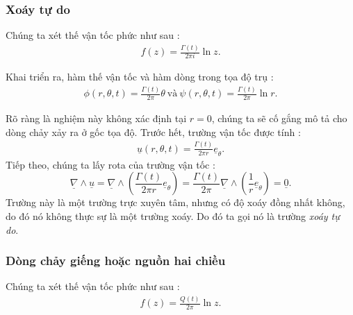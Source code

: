 \documentclass[CO_LUU_CHAT.tex]{subfiles}
\begin{document}
\subsubsection{Xoáy tự do}
Chúng ta xét thế vận tốc phức như sau :
\begin{equation}
	\begin{aligned}
		\boxed{
			f(z)=\frac{\Gamma(t)}{2\pi i}\ln z
		}.
	\end{aligned}
\end{equation}

Khai triển ra, hàm thế vận tốc và hàm dòng trong tọa độ trụ :
\begin{equation}
	\begin{aligned}
		\phi(r,\theta,t)=\frac{\Gamma(t)}{2\pi}\theta\ \text{và}\ \psi(r,\theta,t)=\frac{\Gamma(t)}{2\pi}\ln r.
	\end{aligned}
\end{equation}

Rõ ràng là nghiệm này không xác định tại $r=0$, chúng ta sẽ cố gắng mô tả cho dòng chảy xảy ra ở gốc tọa độ. Trước hết, trường vận tốc được tính :
\begin{equation}
	\begin{aligned}
		\underline{u}(r,\theta,t)=\frac{\Gamma(t)}{2\pi r}\underline{e}_\theta.
	\end{aligned}
\end{equation}
Tiếp theo, chúng ta lấy rota của trường vận tốc :
$$
\underline{\nabla}\wedge\underline{u}=\underline{\nabla}\wedge\left(\frac{\Gamma(t)}{2\pi r}\underline{e}_\theta\right)=\frac{\Gamma(t)}{2\pi}\underline{\nabla}\wedge\left(\frac{1}{r}\underline{e}_\theta\right)=\underline{0}.
$$
Trường này là một trường trực xuyên tâm, nhưng có độ xoáy đồng nhất không, do đó nó không thực sự là một trường xoáy. Do đó ta gọi nó là trường \emph{xoáy tự do}.
\subsubsection{Dòng chảy giếng hoặc nguồn hai chiều}
Chúng ta xét thế vận tốc phức như sau :
\begin{equation}
	\begin{aligned}
		\boxed{
			f(z)=\frac{Q(t)}{2\pi}\ln z
		}.
	\end{aligned}
\end{equation}
\end{document}

